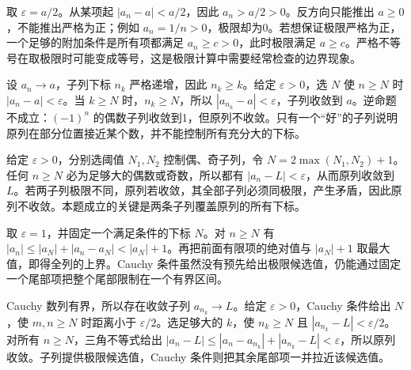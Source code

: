 \documentclass[12pt,fontset=fandol]{ctexart}
\begin{document}
\begin{solve}\label{ans:c2q6}
取 $\varepsilon=a/2$。从某项起 $|a_n-a|<a/2$，因此 $a_n>a/2>0$。反方向只能推出 $a\ge0$，不能推出严格为正；例如 $a_n=1/n>0$，极限却为0。若想保证极限严格为正，一个足够的附加条件是所有项都满足 $a_n\ge c>0$，此时极限满足 $a\ge c$。严格不等号在取极限时可能变成等号，这是极限计算中需要经常检查的边界现象。
\end{solve}

\begin{solve}\label{ans:c2q7}
设 $a_n\to a$，子列下标 $n_k$ 严格递增，因此 $n_k\ge k$。给定 $\varepsilon>0$，选 $N$ 使 $n\ge N$ 时 $|a_n-a|<\varepsilon$。当 $k\ge N$ 时，$n_k\ge N$，所以 $|a_{n_k}-a|<\varepsilon$，子列收敛到 $a$。逆命题不成立：$(-1)^n$ 的偶数子列收敛到1，但原列不收敛。只有一个“好”的子列说明原列在部分位置接近某个数，并不能控制所有充分大的下标。
\end{solve}

\begin{solve}\label{ans:c2q8}
给定 $\varepsilon>0$，分别选阈值 $N_1,N_2$ 控制偶、奇子列，令 $N=2\max(N_1,N_2)+1$。任何 $n\ge N$ 必为足够大的偶数或奇数，所以都有 $|a_n-L|<\varepsilon$，从而原列收敛到 $L$。若两子列极限不同，原列若收敛，其全部子列必须同极限，产生矛盾，因此原列不收敛。本题成立的关键是两条子列覆盖原列的所有下标。
\end{solve}

\begin{solve}\label{ans:c2q9}
取 $\varepsilon=1$，并固定一个满足条件的下标 $N$。对 $n\ge N$ 有 $|a_n|\le|a_N|+|a_n-a_N|<|a_N|+1$。再把前面有限项的绝对值与 $|a_N|+1$ 取最大值，即得全列的上界。Cauchy 条件虽然没有预先给出极限候选值，仍能通过固定一个尾部项把整个尾部限制在一个有界区间。
\end{solve}

\begin{solve}\label{ans:c2q10}
Cauchy 数列有界，所以存在收敛子列 $a_{n_k}\to L$。给定 $\varepsilon>0$，Cauchy 条件给出 $N$，使 $m,n\ge N$ 时距离小于 $\varepsilon/2$。选足够大的 $k$，使 $n_k\ge N$ 且 $|a_{n_k}-L|<\varepsilon/2$。对所有 $n\ge N$，三角不等式给出 $|a_n-L|\le|a_n-a_{n_k}|+|a_{n_k}-L|<\varepsilon$，所以原列收敛。子列提供极限候选值，Cauchy 条件则把其余尾部项一并拉近该候选值。
\end{solve}
\end{document}
